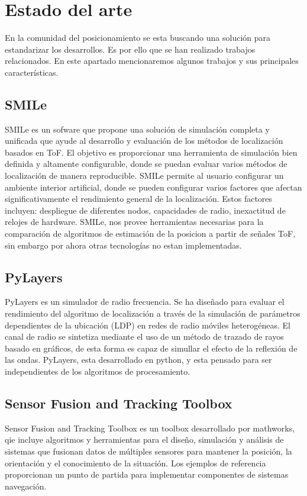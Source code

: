 \section{Estado del arte}
En la comunidad del posicionamiento se esta buscando una solución para estandarizar los desarrollos. Es por ello que se han realizado trabajos relacionados. En este apartado mencionaremos algunos trabajos y sus principales características.
\subsection{SMILe}

SMILe \cite{Jankowski2018} es un sofware que propone una solución de simulación completa y unificada que ayude al desarrollo y evaluación de los métodos de localización basados en  ToF. El objetivo es proporcionar una herramienta de simulación bien definida y altamente configurable, donde se puedan evaluar varios métodos de localización de manera reproducible. SMILe permite al usuario configurar un ambiente interior artificial, donde se pueden configurar varios factores que afectan significativamente el rendimiento general de la localización. Estos factores incluyen: despliegue de diferentes nodos, capacidades de radio, inexactitud de relojes de hardware.  SMILe, nos provee herramientas necesarias para la comparación de algoritmos de estimación de la posicion a partir de señales ToF, sin embargo por ahora otras tecnologías no estan implementadas.

\subsection{PyLayers}

PyLayers\cite{Amiot2013} es un simulador de radio frecuencia. Se ha diseñado para evaluar el rendimiento del algoritmo de localización a través de la simulación  de parámetros dependientes de la ubicación (LDP) en redes de radio móviles heterogéneas. El canal de radio se sintetiza mediante el uso de un método de trazado de rayos basado en gráficos, de esta forma es capaz de simullar el efecto de la reflexión de las ondas.  PyLayers, esta desarrollado en python, y esta pensado para ser independientes de los algoritmos de procesamiento. 
\subsection{Sensor Fusion and Tracking Toolbox}
Sensor Fusion and Tracking Toolbox \cite{Mathworks} es un toolbox desarrollado por mathworks, qie incluye algoritmos y herramientas para el diseño, simulación y análisis de sistemas que fusionan datos de múltiples sensores para mantener la posición, la orientación y el conocimiento de la situación. Los ejemplos de referencia proporcionan un punto de partida para implementar componentes de sistemas navegación.


